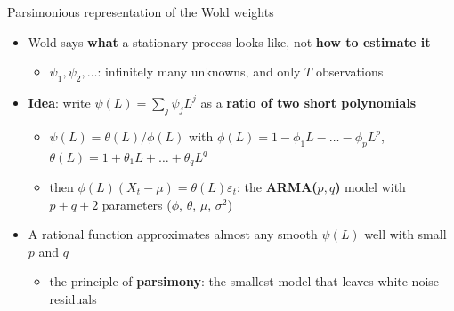 \begin{frame}{Parsimonious representation of the Wold weights}
\itemsize{\small}
\begin{itemize}
    \item Wold says \textbf{what} a stationary process looks like, not \textbf{how to estimate it}
    \begin{itemize}
        \item $\psi_1, \psi_2, \dots$: infinitely many unknowns, and only $T$ observations
    \end{itemize}
    \item \textbf{Idea}: write $\psi(L) = \sum_j\psi_jL^j$ as a \textbf{ratio of two short polynomials}
    \begin{itemize}
        \item $\psi(L) = \theta(L)/\phi(L)$ with $\phi(L) = 1 - \phi_1L - \dots - \phi_pL^p$, $\theta(L) = 1 + \theta_1L + \dots + \theta_qL^q$
        \item then $\phi(L)(X_t - \mu) = \theta(L)\varepsilon_t$: the \textbf{ARMA($p,q$)} model with $p + q + 2$ parameters ($\phi$, $\theta$, $\mu$, $\sigma^2$)
    \end{itemize}
    \item A rational function approximates almost any smooth $\psi(L)$ well with small $p$ and $q$
    \begin{itemize}
        \item the principle of \textbf{parsimony}: the smallest model that leaves white-noise residuals
    \end{itemize}
\end{itemize}
\end{frame}

